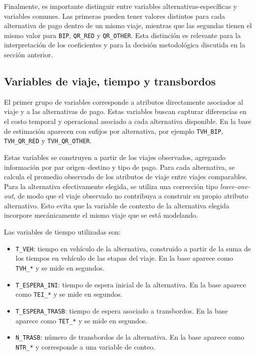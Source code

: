 Finalmente, es importante distinguir entre variables alternativas-específicas y variables comunes. Las primeras pueden tener valores distintos para cada alternativa de pago dentro de un mismo viaje, mientras que las segundas tienen el mismo valor para \texttt{BIP}, \texttt{QR\_RED} y \texttt{QR\_OTHER}. Esta distinción es relevante para la interpretación de los coeficientes y para la decisión metodológica discutida en la sección anterior.

\subsection{Variables de viaje, tiempo y transbordos}

El primer grupo de variables corresponde a atributos directamente asociados al viaje y a las alternativas de pago. Estas variables buscan capturar diferencias en el costo temporal y operacional asociado a cada alternativa disponible. En la base de estimación aparecen con sufijos por alternativa, por ejemplo \texttt{TVH\_BIP}, \texttt{TVH\_QR\_RED} y \texttt{TVH\_QR\_OTHER}.

Estas variables se construyen a partir de los viajes observados, agregando información por par origen--destino y tipo de pago. Para cada alternativa, se calcula el promedio observado de los atributos de viaje entre viajes comparables. Para la alternativa efectivamente elegida, se utiliza una corrección tipo \textit{leave-one-out}, de modo que el viaje observado no contribuya a construir su propio atributo alternativo. Esto evita que la variable de contexto de la alternativa elegida incorpore mecánicamente el mismo viaje que se está modelando.

Las variables de tiempo utilizadas son:

\begin{itemize}
    \item \texttt{T\_VEH}: tiempo en vehículo de la alternativa, construido a partir de la suma de los tiempos en vehículo de las etapas del viaje. En la base aparece como \texttt{TVH\_*} y se mide en segundos.
    \item \texttt{T\_ESPERA\_INI}: tiempo de espera inicial de la alternativa. En la base aparece como \texttt{TEI\_*} y se mide en segundos.
    \item \texttt{T\_ESPERA\_TRASB}: tiempo de espera asociado a transbordos. En la base aparece como \texttt{TET\_*} y se mide en segundos.
    \item \texttt{N\_TRASB}: número de transbordos de la alternativa. En la base aparece como \texttt{NTR\_*} y corresponde a una variable de conteo.
\end{itemize}

